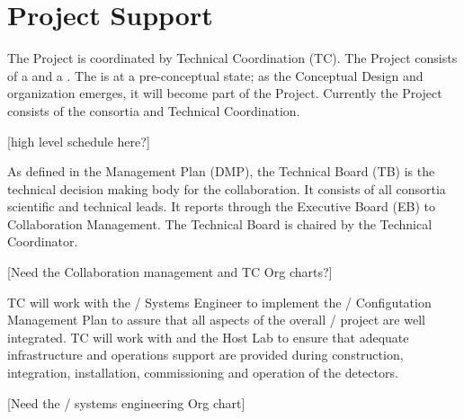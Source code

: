 \section{Project Support}
\label{sec:fdsp-coord-supp}

The  Project is coordinated by Technical Coordination
(TC). The  Project consists of a  and a
. The  is at a pre-conceptual state; as the
Conceptual Design and organization emerges, it will become part of the
 Project. Currently the  Project consists of
the   consortia and Technical Coordination.

[high level schedule here?]

As defined in the  Management Plan (DMP), the 
Technical Board (TB) is the technical decision making body for the
collaboration. It consists of all consortia scientific and technical
leads. It reports through the Executive Board (EB) to Collaboration
Management. The  Technical Board is chaired by the
Technical Coordinator.

[Need the Collaboration management and TC Org charts?]


TC will work with the / Systems Engineer to
implement the / Configutation Management Plan
to assure that all aspects of the overall /
project are well integrated. TC will work with  and the
Host Lab to ensure that adequate infrastructure and operations support
are provided during construction, integration, installation,
commissioning and operation of the detectors.

[Need the / systems engineering Org chart]


